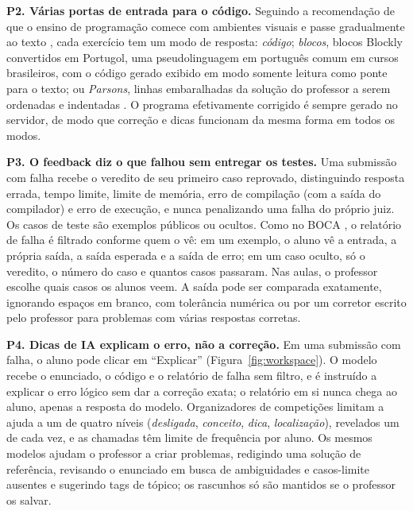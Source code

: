\documentclass[12pt]{article}
\begin{document}
\textbf{P2. Várias portas de entrada para o código.} Seguindo a recomendação de que o ensino de programação comece com ambientes visuais e passe gradualmente ao texto \cite{audrito2012contests,weintrop2015block}, cada exercício tem um modo de resposta: \emph{código}; \emph{blocos}, blocos Blockly convertidos em Portugol, uma pseudolinguagem em português comum em cursos brasileiros, com o código gerado exibido em modo somente leitura como ponte para o texto; ou \emph{Parsons}, linhas embaralhadas da solução do professor a serem ordenadas e indentadas \cite{parsons2006puzzles}. O programa efetivamente corrigido é sempre gerado no servidor, de modo que correção e dicas funcionam da mesma forma em todos os modos.

\textbf{P3. O feedback diz o que falhou sem entregar os testes.}\label{sec:verdicts}\label{sec:test-confidentiality} Uma submissão com falha recebe o veredito de seu primeiro caso reprovado, distinguindo resposta errada, tempo limite, limite de memória, erro de compilação (com a saída do compilador) e erro de execução, e nunca penalizando uma falha do próprio juiz. Os casos de teste são exemplos públicos ou ocultos. Como no BOCA \cite{de2004boca}, o relatório de falha é filtrado conforme quem o vê: em um exemplo, o aluno vê a entrada, a própria saída, a saída esperada e a saída de erro; em um caso oculto, só o veredito, o número do caso e quantos casos passaram. Nas aulas, o professor escolhe quais casos os alunos veem. A saída pode ser comparada exatamente, ignorando espaços em branco, com tolerância numérica ou por um corretor escrito pelo professor para problemas com várias respostas corretas.\label{sec:output-comparison}

\textbf{P4. Dicas de IA explicam o erro, não a correção.}\label{sec:ai-chain} Em uma submissão com falha, o aluno pode clicar em ``Explicar'' (Figura~\ref{fig:workspace}). O modelo recebe o enunciado, o código e o relatório de falha sem filtro, e é instruído a explicar o erro lógico sem dar a correção exata; o relatório em si nunca chega ao aluno, apenas a resposta do modelo. Organizadores de competições limitam a ajuda a um de quatro níveis (\emph{desligada}, \emph{conceito}, \emph{dica}, \emph{localização}), revelados um de cada vez, e as chamadas têm limite de frequência por aluno. Os mesmos modelos ajudam o professor a criar problemas, redigindo uma solução de referência, revisando o enunciado em busca de ambiguidades e casos-limite ausentes e sugerindo tags de tópico; os rascunhos só são mantidos se o professor os salvar.
\end{document}
